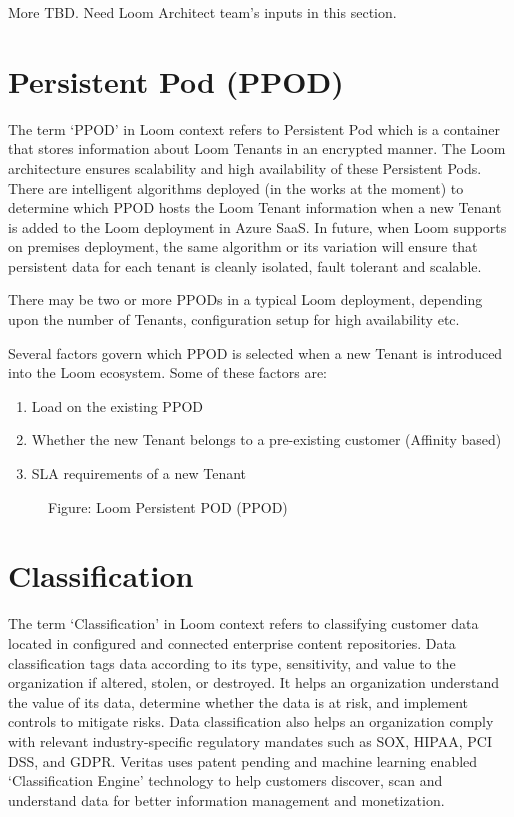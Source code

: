 \documentclass[letterpaper,10pt,english]{sphinxmanual}
\begin{document}
More TBD. Need Loom Architect team’s inputs in this section.


\section{Persistent Pod (PPOD)}
\label{\detokenize{mcdmp_concepts:persistent-pod-ppod}}\label{\detokenize{mcdmp_concepts:term-ppod}}
The term ‘PPOD’ in Loom context refers to Persistent Pod which is a container that stores information about Loom Tenants in an encrypted manner.  The Loom architecture ensures scalability and high availability of these Persistent Pods. There are intelligent algorithms deployed (in the works at the moment) to determine which PPOD hosts the Loom Tenant information when a new Tenant is added to the Loom deployment in Azure SaaS. In future, when Loom supports on premises deployment, the same algorithm or its variation will ensure that persistent data for each tenant is cleanly isolated, fault tolerant and scalable.

There may be two or more PPODs in a typical Loom deployment, depending upon the number of Tenants, configuration setup for high availability etc.

Several factors govern which PPOD is selected when a new Tenant is introduced into the Loom ecosystem. Some of these factors are:
\begin{enumerate}
\item {} 
Load on the existing PPOD

\item {} 
Whether the new Tenant belongs to a pre-existing customer (Affinity based)

\item {} 
SLA requirements of a new Tenant

\end{enumerate}

\begin{figure}[htbp]
\centering
\capstart

\noindent{}
\caption{Figure: Loom Persistent POD (PPOD)}\label{\detokenize{mcdmp_concepts:id18}}\end{figure}


\section{Classification}
\label{\detokenize{mcdmp_concepts:term-classification}}\label{\detokenize{mcdmp_concepts:classification}}
The term ‘Classification’ in Loom context refers to classifying customer data located in configured and connected enterprise content repositories. Data classification tags data according to its type, sensitivity, and value to the organization if altered, stolen, or destroyed. It helps an organization understand the value of its data, determine whether the data is at risk, and implement controls to mitigate risks.  Data classification also helps an organization comply with relevant industry-specific regulatory mandates such as SOX, HIPAA, PCI DSS, and GDPR. Veritas uses patent pending and machine learning enabled ‘Classification Engine’ technology to help customers discover, scan and understand data for better information management and monetization.
\end{document}
